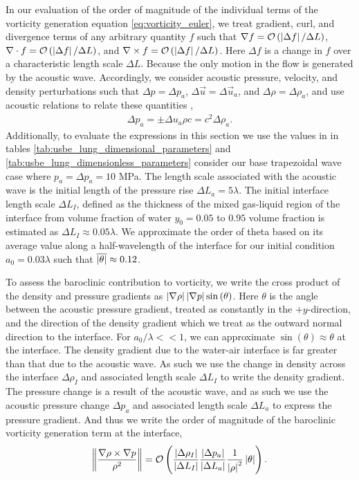 In our evaluation of the order of magnitude of the individual terms of
the vorticity generation equation \eqref{eq:vorticity_euler}, we treat
gradient, curl, and divergence terms of any arbitrary quantity $f$
such that $\nabla f= \mathcal{O}\left(\left|\Delta f\right|/\Delta L\right)$,
$\nabla\cdot f=\mathcal{O}\left(\left|\Delta f\right|/\Delta L\right)$, and
$\nabla\times f=\mathcal{O}\left(\left|\Delta f\right|/\Delta L\right)$. Here
$\Delta f$ is a change in $f$ over a characteristic length scale
$\Delta L$. Because the only motion in the flow is generated by the
acoustic wave. Accordingly, we consider acoustic pressure, velocity,
and density perturbations such that $\Delta p=\Delta p_a$,
$\Delta \vec{u}=\Delta \vec{u}_a$, and $\Delta \rho=\Delta \rho_a$,
and use acoustic relations to relate these quantities
\citep{Anderson1990},
\begin{align}%
  \label{eq:acoustic_relations}%
  \Delta p_a=\pm\Delta u_a \rho c=c^2\Delta \rho_a.%
\end{align}
Additionally, to evaluate the expressions in this section we use the
values in in tables \ref{tab:usbe_lung_dimensional_parameters} and
\ref{tab:usbe_lung_dimensionless_parameters} consider our base
trapezoidal wave case where $p_a = \Delta p_a = 10$ MPa. The length
scale associated with the acoustic wave is the initial length of the
pressure rise $\Delta L_a=5\lambda$. The initial interface length
scale $\Delta L_I$, defined as the thickness of the mixed gas-liquid
region of the interface from volume fraction of water $y_0=0.05$ to
$0.95$ volume fraction is estimated as
$\Delta L_I \approx 0.05\lambda$. We approximate the order of theta
based on its average value along a half-wavelength of the interface
for our initial condition $a_0=0.03\lambda$ such that
$\overline{\left|\theta\right|}\approx0.12$.

To assess the baroclinic contribution to vorticity, we write the cross
product of the density and pressure gradients as
$\left|\nabla \rho\right| \left|\nabla p\right| \sin{\left(\theta\right)}$. Here
$\theta$ is the angle between the acoustic pressure gradient, treated
as constantly in the $\plus y$-direction, and the direction of the
density gradient which we treat as the outward normal direction to the
interface. For $a_0/\lambda<<1$, we can approximate
$\sin{\left(\theta\right)}\approx\theta$ at the interface. The density
gradient due to the water-air interface is far greater than that due
to the acoustic wave. As such we use the change in density across the
interface $\Delta \rho_I$ and associated length scale $\Delta L_I$ to
write the density gradient. The pressure change is a result of the
acoustic wave, and as such we use the acoustic pressure change
$\Delta p_a$ and associated length scale $\Delta L_a$ to express the
pressure gradient. And thus we write the order of magnitude of the
baroclinic vorticity generation term at the interface,
\begin{align}
  \label{eq:baroclinic_vorticity}%
  \norm{\frac{\nabla\rho\times\nabla p}{\rho^2}} = \orderof{\frac{\abs{\Delta \rho_I}}{\abs{\Delta L_I}}\frac{\abs{\Delta p_a}}{\abs{\Delta L_a}}\frac{1}{\abs{\rho}^2}\abs{\theta}}.%
\end{align}

